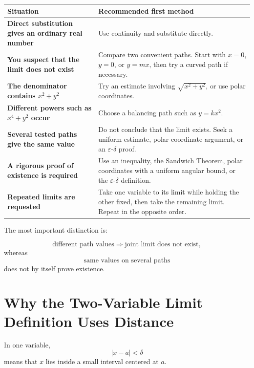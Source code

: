 \documentclass[11pt,oneside]{book}
\theoremstyle{studentthm}
\theoremstyle{definition}
\newcommand{\eps}{\varepsilon}
\begin{document}
\begin{center}
\renewcommand{\arraystretch}{1.35}
\begin{tabularx}{0.94\textwidth}{>{\bfseries}p{}X}
\toprule
Situation & Recommended first method\\
\midrule
Direct substitution gives an ordinary real number
&
Use continuity and substitute directly.
\\

You suspect that the limit does not exist
&
Compare two convenient paths. Start with \(x=0\), \(y=0\), or
\(y=mx\), then try a curved path if necessary.
\\

The denominator contains \(x^2+y^2\)
&
Try an estimate involving
\(\sqrt{x^2+y^2}\), or use polar coordinates.
\\

Different powers such as \(x^4+y^2\) occur
&
Choose a balancing path such as \(y=kx^2\).
\\

Several tested paths give the same value
&
Do not conclude that the limit exists. Seek a uniform estimate,
polar-coordinate argument, or an \(\eps\)-\(\delta\) proof.
\\

A rigorous proof of existence is required
&
Use an inequality, the Sandwich Theorem, polar coordinates with a
uniform angular bound, or the \(\eps\)-\(\delta\) definition.
\\

Repeated limits are requested
&
Take one variable to its limit while holding the other fixed, then
take the remaining limit. Repeat in the opposite order.
\\
\bottomrule
\end{tabularx}
\end{center}

The most important distinction is:

\[
\text{different path values}
\Longrightarrow
\text{joint limit does not exist},
\]
whereas
\[
\text{same values on several paths}
\]
does not by itself prove existence.



\section{Why the Two-Variable Limit Definition Uses Distance}

In one variable,
\[
|x-a|<\delta
\]
means that \(x\) lies inside a small interval centered at \(a\).
\end{document}
